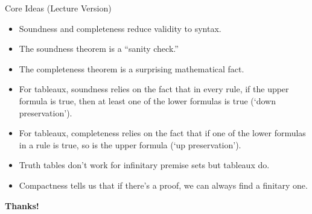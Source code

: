 \begin{frame}{Core Ideas (Lecture Version)}


\begin{itemize}

	\item Soundness and completeness reduce validity to syntax.
	
	\item The soundness theorem is a ``sanity check.''
	
	\item The completeness theorem is a surprising mathematical fact.
		
	\item For tableaux, soundness relies on the fact that in every rule, if the upper formula is true, then at least one of the lower formulas is true (`down preservation').
	
	\item For tableaux, completeness relies on the fact that if one of the lower formulas in a rule is true, so is the upper formula (`up preservation').
	
	\item Truth tables don't work for infinitary premise sets but tableaux do.
	
	\item Compactness tells us that if there's a proof, we can always find a finitary one.

\end{itemize}

\end{frame}



\begin{frame}

	\begin{center}
	{\huge\bf Thanks!}
	\end{center}

\end{frame}


